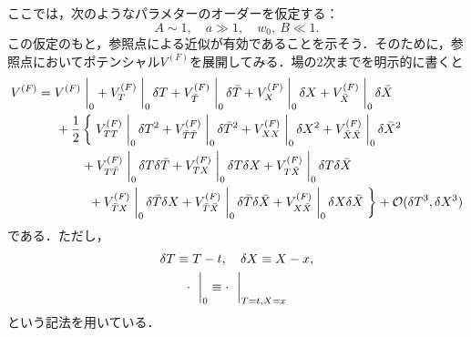 \documentclass[a4paper,uplatex,dvipdfmx]{jsarticle}
\theoremstyle{definition}
\begin{document}
ここでは，次のようなパラメターのオーダーを仮定する：
\begin{equation}
   A\sim 1
   ,\quad
   a\gg 1
   ,\quad 
   w_0,\ B\ll 1
   .
   \label{assumption_parameter_Polonyi-KKLT}
\end{equation}
この仮定のもと，参照点による近似が有効であることを示そう．そのために，参照点においてポテンシャル$V^{(F)}$を展開してみる．場の2次までを明示的に書くと
\begin{align}
   V^{(F)}
   &=
   V^{(F)}
   \left.\vphantom{\frac{1}{2}}\right|_{0}
   +
   V^{(F)}_{T}
   \left.\vphantom{\frac{1}{2}}\right|_{0} 
   \delta T
   +
   V^{(F)}_{\bar{T}}
   \left.\vphantom{\frac{1}{2}}\right|_{0} 
   \delta \bar{T}
   +
   V^{(F)}_{X}
   \left.\vphantom{\frac{1}{2}}\right|_{0} 
   \delta X
   +
   V^{(F)}_{\bar{X}}
   \left.\vphantom{\frac{1}{2}}\right|_{0} 
   \delta \bar{X}
   \nonumber
   \\
   &\hspace*{0.5cm}
   +
   \frac{1}{2}
   \left\{\vphantom{\frac{1}{2}}\right.
   V^{(F)}_{TT}
   \left.\vphantom{\frac{1}{2}}\right|_{0} 
   \delta T^2
   +
   V^{(F)}_{\bar{T}\bar{T}}
   \left.\vphantom{\frac{1}{2}}\right|_{0} 
   \delta \bar{T}^2
   +
   V^{(F)}_{XX}
   \left.\vphantom{\frac{1}{2}}\right|_{0} 
   \delta X^2
   +
   V^{(F)}_{\bar{X}\bar{X}}
   \left.\vphantom{\frac{1}{2}}\right|_{0} 
   \delta \bar{X}^2
   \nonumber
   \\
   &\hspace*{1.2cm}
   +
   V^{(F)}_{T\bar{T}}
   \left.\vphantom{\frac{1}{2}}\right|_{0} 
   \delta T\delta \bar{T}
   +
   V^{(F)}_{TX}
   \left.\vphantom{\frac{1}{2}}\right|_{0} 
   \delta T\delta X
   +
   V^{(F)}_{T\bar{X}}
   \left.\vphantom{\frac{1}{2}}\right|_{0} 
   \delta T\delta \bar{X}
   \nonumber
   \\
   &\hspace*{1.4cm}
   +
   V^{(F)}_{\bar{T}X}
   \left.\vphantom{\frac{1}{2}}\right|_{0} 
   \delta \bar{T}\delta X
   +
   V^{(F)}_{\bar{T}\bar{X}}
   \left.\vphantom{\frac{1}{2}}\right|_{0} 
   \delta \bar{T}\delta \bar{X}
   +
   V^{(F)}_{X\bar{X}}
   \left.\vphantom{\frac{1}{2}}\right|_{0} 
   \delta X\delta \bar{X}
   \left.\vphantom{\frac{1}{2}}\right\}
   +
   \mathcal{O}(\delta T^3,\delta X^3)
   \label{expansion_F-term}
\end{align}
である．ただし，
\begin{gather}
   \delta T
   \equiv
   T-t
   ,\quad
   \delta X
   \equiv
   X-x
   ,
   \nonumber
   \\
   \cdot\ 
   \left.\vphantom{\frac{1}{2}}\right|_{0}
   \equiv
   \cdot\ 
   \left.\vphantom{\frac{1}{2}}\right|_{T=t,X=x}
   \nonumber
\end{gather}
という記法を用いている．
\end{document}
